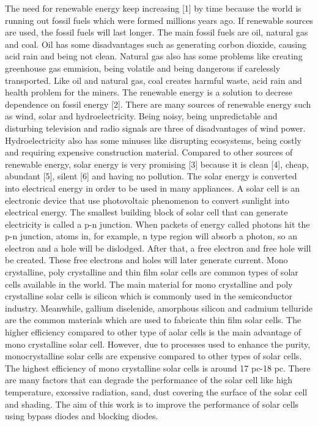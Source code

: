 \documentclass[a4paper,12pt]{article}
\begin{document}
The need for renewable energy keep increasing [1] by time because the world is running out fossil fuels which were formed millions years ago. If renewable sources are used, the fossil fuels will last longer. The main fossil fuels are oil, natural gas and coal. Oil has some disadvantages such as generating corbon dioxide, causing acid rain and being not clean. Natural gas also has some problems like creating greenhouse gas emmision, being volatile and being dangerous if carelessly transported. Like oil and natural gas, coal creates harmful waste, acid rain and health problem for the miners. The renewable energy is a solution to decrese dependence on fossil energy [2]. There are many sources of renewable energy such as wind, solar and hydroelectricity. Being noisy, being unpredictable and disturbing television and radio signals are three of disadvantages of wind power. Hydroelectricity also has some minuses like disrupting ecosystems, being costly and requiring expensive construction material. Compared to other sources of renewable energy, solar energy is very promising [3] because it is clean [4], cheap, abundant [5], silent [6] and having no pollution.  The solar energy is converted into electrical energy in order to be used in many appliances. A solar cell is an electronic device that use photovoltaic phenomenon to convert sunlight into electrical energy. The smallest building block of solar cell that can generate electricity is called a p-n junction. When packets of energy called photons hit the p-n junction, atoms in, for example, n type region will absorb a photon, so an electron and a hole will be dislodged. After that, a free electron and free hole will be created. These free electrons and holes will later generate current. Mono crystalline, poly crystalline and thin film solar cells are common types of solar cells available in the world. The main material for mono crystalline and poly crystalline solar cells is silicon which is commonly used in the semiconductor industry. Meanwhile, gallium diselenide, amorphous silicon and cadmium telluride  are the common materials which are used to fabricate thin film solar cells. The higher efficiency compared to other type of aolar cells is the main advantage of mono crystalline solar cell. However, due to processes used to enhance the purity, monocrystalline solar cells are expensive compared to other types of solar cells. The highest efficiency of mono crystalline solar cells is around 17 pc-18 pc. There are many factors that can degrade the performance of the solar cell like high temperature, excessive radiation, sand, dust covering the surface of the solar cell and shading. The aim of this work is to improve the performance of solar cells using bypass diodes and blocking diodes.\\
\end{document}

